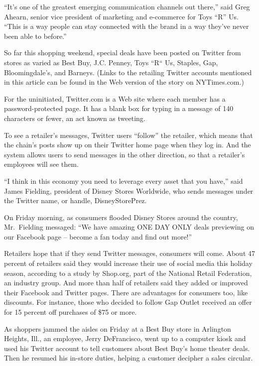 ﻿\documentclass[12pt]{article}
\begin{document}
``It's one of the greatest emerging communication channels out there,'' said Greg Ahearn, senior
vice president of marketing and e-commerce for Toys ``R'' Us. ``This is a way people can stay
connected with the brand in a way they've never been able to before.''

So far this shopping weekend, special deals have been posted on Twitter from stores as varied as
Best Buy, J.C. Penney, Toys ``R`` Us, Staples, Gap, Bloomingdale's, and Barneys. (Links to the
retailing Twitter accounts mentioned in this article can be found in the Web version of the story on
NYTimes.com.)

For the uninitiated, Twitter.com is a Web site where each member has a password-protected page. It
has a blank box for typing in a message of 140 characters or fewer, an act known as tweeting.

To see a retailer's messages, Twitter users ``follow'' the retailer, which means that the chain's
posts show up on their Twitter home page when they log in. And the system allows users to send
messages in the other direction, so that a retailer's employees will see them.

``I think in this economy you need to leverage every asset that you have,'' said James Fielding,
president of Disney Stores Worldwide, who sends messages under the Twitter name, or handle,
DisneyStorePrez.

On Friday morning, as consumers flooded Disney Stores around the country, Mr.~Fielding messaged:
``We have amazing ONE DAY ONLY deals previewing on our Facebook page -- become a fan today and find
out more!''

Retailers hope that if they send Twitter messages, consumers will come. About 47 percent of
retailers said they would increase their use of social media this holiday season, according to a
study by Shop.org, part of the National Retail Federation, an industry group. And more than half of
retailers said they added or improved their Facebook and Twitter pages. There are advantages for
consumers too, like discounts. For instance, those who decided to follow Gap Outlet received an
offer for 15 percent off purchases of \$75 or more.

As shoppers jammed the aisles on Friday at a Best Buy store in Arlington Heights, Ill., an employee,
Jerry DeFrancisco, went up to a computer kiosk and used his Twitter account to tell customers about
Best Buy's home theater deals. Then he resumed his in-store duties, helping a customer decipher a
sales circular.
\end{document}
